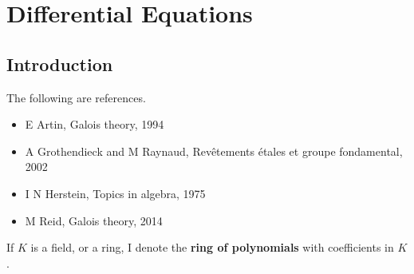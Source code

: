 \documentclass[../Year1/Year1.tex]{subfiles}
\begin{document}
\chapter{Differential Equations}
\renewcommand*\thesection{\arabic{section}}

\section{Introduction}


The following are references.
\begin{itemize}
\item E Artin, Galois theory, 1994
\item A Grothendieck and M Raynaud, Rev\^etements \'etales et groupe fondamental, 2002
\item I N Herstein, Topics in algebra, 1975
\item M Reid, Galois theory, 2014
\end{itemize}

\begin{notation*}
If $ K $ is a field, or a ring, I denote
the \textbf{ring of polynomials} with coefficients in $ K $.
\end{notation*}
\end{document}
